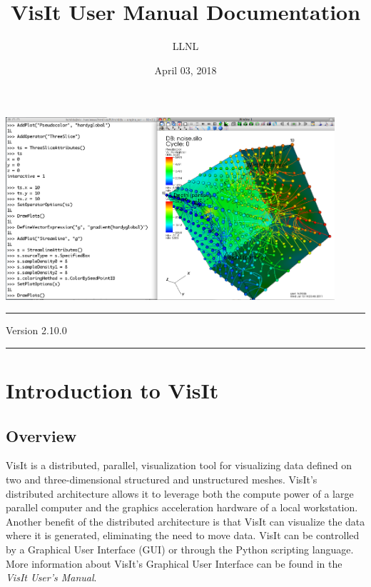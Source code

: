 \documentclass[letterpaper,10pt,english]{sphinxmanual}
\title{VisIt User Manual Documentation}
\date{April 03, 2018}
\author{LLNL}
\begin{document}
\maketitle
\tableofcontents
{}\label{index::doc}


\begin{DUlineblock}{0em}
\item[] \includegraphics[width=4.8in]{teaser.png}
\end{DUlineblock}


\bigskip\hrule{}\bigskip


\begin{DUlineblock}{0em}
\item[] Version 2.10.0
\end{DUlineblock}


\bigskip\hrule{}\bigskip



\chapter{Introduction to VisIt}
\label{intro:pythonmanual}\label{intro::doc}\label{intro:visit-python-interface-manual}\label{intro:introduction-to-visit}

\section{Overview}
\label{intro:overview}
VisIt is a distributed, parallel, visualization tool for visualizing
data defined on two and three-dimensional structured and unstructured
meshes. VisIt’s distributed architecture allows it to leverage both the
compute power of a large parallel computer and the graphics acceleration
hardware of a local workstation. Another benefit of the distributed
architecture is that VisIt can visualize the data where it is generated,
eliminating the need to move data. VisIt can be controlled by a
Graphical User Interface (GUI) or through the Python scripting language.
More information about VisIt’s Graphical User Interface can be found in
the \emph{VisIt User’s Manual}.
\end{document}
